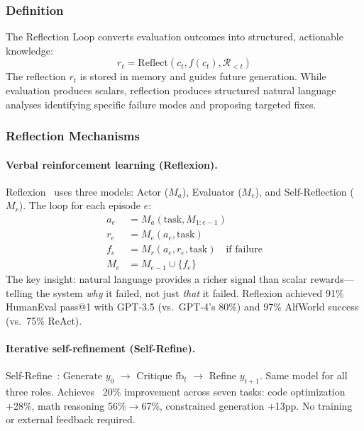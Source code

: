 \subsubsection{Definition}

The Reflection Loop converts evaluation outcomes into structured, actionable knowledge:
\begin{equation}
    r_t = \text{Reflect}(c_t, f(c_t), \mathcal{R}_{<t})
\end{equation}
The reflection $r_t$ is stored in memory and guides future generation. While evaluation produces scalars, reflection produces structured natural language analyses identifying specific failure modes and proposing targeted fixes.

\subsubsection{Reflection Mechanisms}

\paragraph{Verbal reinforcement learning (Reflexion).}
Reflexion~\citep{shinn2023reflexion} uses three models: Actor ($M_a$), Evaluator ($M_e$), and Self-Reflection ($M_r$). The loop for each episode $e$:
\begin{align}
    a_e &= M_a(\text{task}, M_{1:e-1}) \\
    r_e &= M_e(a_e, \text{task}) \\
    f_e &= M_r(a_e, r_e, \text{task}) \quad \text{if failure} \\
    M_e &= M_{e-1} \cup \{f_e\}
\end{align}
The key insight: natural language provides a richer signal than scalar rewards---telling the system \emph{why} it failed, not just \emph{that} it failed. Reflexion achieved 91\% HumanEval pass@1 with GPT-3.5 (vs.\ GPT-4's 80\%) and 97\% AlfWorld success (vs.\ 75\% ReAct).

\paragraph{Iterative self-refinement (Self-Refine).}
Self-Refine~\citep{madaan2023selfrefine}: Generate $y_0$ $\rightarrow$ Critique $\text{fb}_t$ $\rightarrow$ Refine $y_{t+1}$. Same model for all three roles. Achieves ~20\% improvement across seven tasks: code optimization +28\%, math reasoning 56\%$\rightarrow$67\%, constrained generation +13pp. No training or external feedback required.

